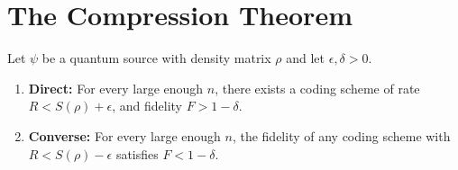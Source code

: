 \documentclass[12pt,a4paper]{article}
\begin{document}
\section{The Compression Theorem }
\begin{theorem}
\label{thm:QuantumCoding}
    Let $ \psi$ be a quantum source with density matrix $\rho$ and
    let $\epsilon,\delta>0$.

    \begin{enumerate}
    \item
        \textbf{Direct:} For every large enough $n$, there exists a coding
        scheme of rate $R<S\left(\rho\right)+\epsilon$, and fidelity
        $F>1-\delta$.
    \item
        \textbf{Converse:} For every large enough $n$, the fidelity of any coding scheme with
        $R<S\left(\rho\right)-\epsilon$
        satisfies $F<1-\delta$.\\
    \end{enumerate}
\end{theorem}
\end{document}
